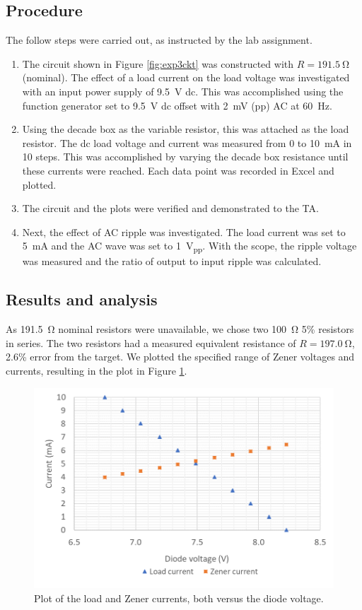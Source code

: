 \documentclass{report}
\newcommand{\pp}{_{pp}}
\newcommand{\Vpp}{\V\pp}
\begin{document}
\subsection{Procedure}
The follow steps were carried out, as instructed by the lab assignment.
\begin{enumerate}
	\item The circuit shown in Figure \ref{fig:exp3ckt} was constructed with $R=\SI{191.5}{\ohm}$ (nominal). The effect of a load current on the load voltage was investigated with an input power supply of \SI{9.5}{\V} dc. This was accomplished using the function generator set to \SI{9.5}{\V} dc offset with \SI{2}{\mV} (pp) AC at \SI{60}{\Hz}.
	
	\item Using the decade box as the variable resistor, this was attached as the load resistor. The dc load voltage and current was measured from \num{0} to \SI{10}{\mA} in 10 steps. This was accomplished by varying the decade box resistance until these currents were reached. Each data point was recorded in Excel and plotted.
	\item The circuit and the plots were verified and demonstrated to the TA.
	\item Next, the effect of AC ripple was investigated. The load current was set to \SI{5}{\mA} and the AC wave was set to \SI{1}{\Vpp}. With the scope, the ripple voltage was measured and the ratio of output to input ripple was calculated.
\end{enumerate}

\subsection{Results and analysis}
As \SI{191.5}{\ohm} nominal resistors were unavailable, we chose two \SI{100}{\ohm} 5\% resistors in series. The two resistors had a measured equivalent resistance of $R=\SI{197.0}{\ohm}$, 2.6\% error from the target. We plotted the specified range of Zener voltages and currents, resulting in the plot in Figure \ref{fig:exp3plot}.
\begin{figure}[h]
	\centering
	\includegraphics[width=0.7\linewidth]{exp3plot}
	\caption{Plot of the load and Zener currents, both versus the diode voltage.}
	\label{fig:exp3plot}
\end{figure}
\end{document}
